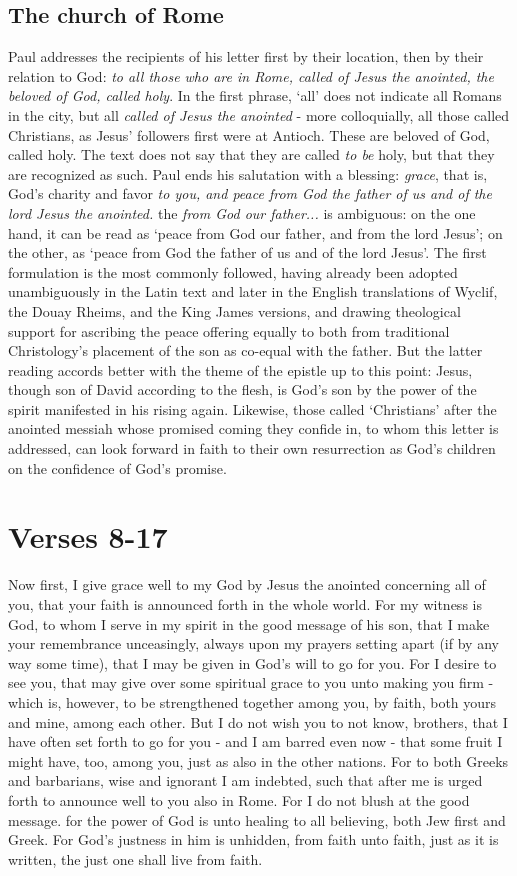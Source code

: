 \subsection{The church of Rome}
Paul addresses the recipients of his letter first by their location, then by their relation to God: \emph{to all those who are in Rome, called of Jesus the anointed, the beloved of God, called holy}. In the first phrase, `all' does not indicate all Romans in the city, but all \emph{called of Jesus the anointed} - more colloquially, all those called Christians, as Jesus' followers first were at Antioch. These are beloved of God, called holy. The text does not say that they are called \emph{to be} holy, but that they are recognized as such. Paul ends his salutation with a blessing: \emph{grace}, that is, God's charity and favor \emph{to you, and peace from God the father of us and of the lord Jesus the anointed.} the \emph{from God our father...} is ambiguous: on the one hand, it can be read as `peace from God our father, and from the lord Jesus'; on the other, as `peace from God the father of us and of the lord Jesus'. The first formulation is the most commonly followed, having already been adopted unambiguously in the Latin text and later in the English translations of Wyclif, the Douay Rheims, and the King James versions, and drawing theological support for ascribing the peace offering equally to both from traditional Christology's placement of the son as co-equal with the father. But the latter reading accords better with the theme of the epistle up to this point: Jesus, though son of David according to the flesh, is God's son by the power of the spirit manifested in his rising again. Likewise, those called `Christians' after the anointed messiah whose promised coming they confide in, to whom this letter is addressed, can look forward in faith to their own resurrection as God's children on the confidence of God's promise.

\section{Verses 8-17}
Now first, I give grace well to my God by Jesus the anointed concerning all of you, that your faith is announced forth in the whole world. For my witness is God, to whom I serve in my spirit in the good message of his son, that I make your remembrance unceasingly, always upon my prayers setting apart (if by any way some time), that I may be given in God's will to go for you. For I desire to see you, that may give over some spiritual grace to you unto making you firm - which is, however, to be strengthened together among you, by faith, both yours and mine, among each other. But I do not wish you to not know, brothers, that I have often set forth to go for you -  and I am barred even now - that some fruit I might have, too, among you, just as also in the other nations. For  to both Greeks and barbarians, wise and ignorant I am indebted, such that after me is urged forth to announce well to you also in Rome. For I do not blush at the good message. for the power of God is unto healing to all believing, both Jew first and Greek. For God's justness in him is unhidden, from faith unto faith, just as it is written, the just one shall live from faith. 